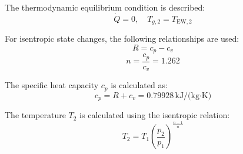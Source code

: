 The thermodynamic equilibrium condition is described:  
\[
\dot{Q} = 0, \quad T_{g,2} = T_{\text{EW},2}
\]  

For isentropic state changes, the following relationships are used:  
\[
R = c_p - c_v
\]  
\[
n = \frac{c_p}{c_v} = 1.262
\]  

The specific heat capacity \( c_p \) is calculated as:  
\[
c_p = R + c_v = 0.79928 \, \text{kJ/(kg·K)}
\]  

The temperature \( T_2 \) is calculated using the isentropic relation:  
\[
T_2 = T_1 \left( \frac{p_2}{p_1} \right)^{\frac{n-1}{n}}
\]